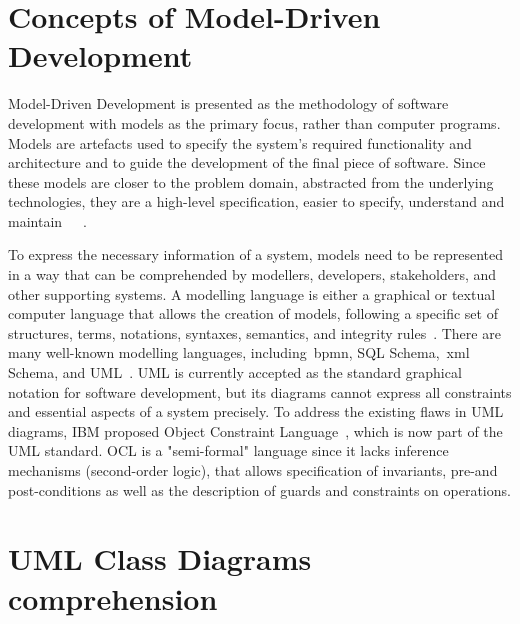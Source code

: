 \section{Concepts of Model-Driven Development} 
\label{sec:RelatedWork-ModelDrivenDevelopment}

Model-Driven Development is presented as the methodology of software development with models as the primary focus, rather than computer programs. Models are artefacts used to specify the system's required functionality and architecture and to guide the development of the final piece of software. Since these models are closer to the problem domain, abstracted from the underlying technologies, they are a high-level specification, easier to specify, understand and maintain~\cite{mda2014}~\cite{Selic2003}~\cite{Atkinson2003}.

To express the necessary information of a system, models need to be represented in a way that can be comprehended by modellers, developers, stakeholders, and other supporting systems. A modelling language is either a graphical or textual computer language that allows the creation of models, following a specific set of structures, terms, notations, syntaxes, semantics, and integrity rules~\cite{mda2014}. There are many well-known modelling languages, including~\gls{bpmn}, SQL Schema,~\gls{xml} Schema, and UML~\cite{uml2005}. UML is currently accepted as the standard graphical notation for software development, but its diagrams cannot express all constraints and essential aspects of a system precisely. To address the existing flaws in UML diagrams, IBM proposed Object Constraint Language~\cite{ocl2014}, which is now part of the UML standard. OCL is a "semi-formal" language since it lacks inference mechanisms (second-order logic), that allows specification of invariants, pre-and post-conditions as well as the description of guards and constraints on operations.

\section{UML Class Diagrams comprehension} 
\label{sec:RelatedWork-UML}

